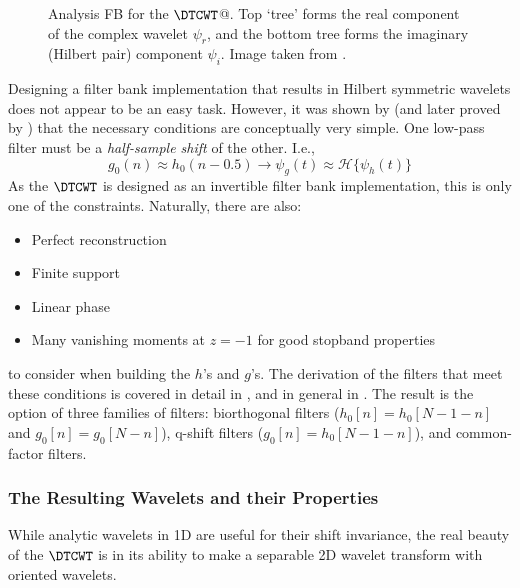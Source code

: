   \begin{figure}
    \centering
      \caption[Analysis FB for the $\DTCWT$]
              {Analysis FB for the $\DTCWT$@. Top `tree' forms the real
              component of the complex wavelet $\psi_r$, and the bottom tree forms the
              imaginary (Hilbert pair) component $\psi_i$. Image taken from
              \citep{selesnick_dual-tree_2005}.}
      \label{fig:ch2:dtcwt_1d_fb}
  \end{figure}

  Designing a filter bank implementation that results in Hilbert symmetric
  wavelets does not appear to be an easy task. However, it was shown
  by \citet{kingsbury_image_1999} (and later proved by
  \citet{selesnick_hilbert_2001}) that the necessary conditions are
  conceptually very simple. One low-pass filter must be a \emph{half-sample shift} of
  the other. I.e.,\ 
  \begin{equation}
    g_0(n) \approx h_0(n-0.5) \rightarrow \psi_g(t) \approx
    \mathcal{H}\{\psi_h(t)\}
  \end{equation}
  As the $\DTCWT$ is designed as an invertible filter bank implementation, this
  is only one of the constraints. Naturally, there are also:
  \begin{itemize}
    \item Perfect reconstruction
    \item Finite support
    \item Linear phase
    \item Many vanishing moments at $z=-1$ for good stopband properties
  \end{itemize}
  to consider when building the $h$'s and $g$'s.
  The derivation of the filters that meet these conditions is covered in
  detail in \citep{kingsbury_complex_2001, kingsbury_design_2003}, and in
  general in \citep{selesnick_dual-tree_2005}. The result is the
  option of three families of filters:  biorthogonal filters ($h_0[n] =
  h_0[N-1-n]$ and $g_0[n] = g_0[N-n]$), q-shift filters ($g_0[n]
  = h_0[N-1-n]$), and common-factor filters.

\subsubsection{The Resulting Wavelets and their Properties}
  While analytic wavelets in 1D are useful for their shift invariance, the real
  beauty of the $\DTCWT$ is in its ability to make a separable 2D wavelet
  transform with oriented wavelets. 
  
